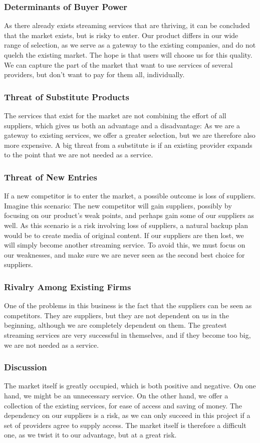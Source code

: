 \subsubsection*{Determinants of Buyer Power}
As there already exists streaming services that are thriving, it can be concluded that the market exists, but is risky to enter. Our product differs in our wide range of selection, as we serve as a gateway to the existing companies, and do not quelch the existing market. The hope is that users will choose us for this quality. We can capture the part of the market that want to use services of several providers, but don't want to pay for them all, individually.

\subsubsection*{Threat of Substitute Products}
The services that exist for the market are not combining the effort of all suppliers, which gives us both an advantage and a disadvantage: As we are a gateway to existing services, we offer a greater selection, but we are therefore also more expensive. A big threat from a substitute is if an existing provider expands to the point that we are not needed as a service.

\subsubsection*{Threat of New Entries}
If a new competitor is to enter the market, a possible outcome is loss of suppliers. Imagine this scenario: The new competitor will gain suppliers, possibly by focusing on our product's weak points, and perhaps gain some of our suppliers as well. As this scenario is a risk involving loss of suppliers, a natural backup plan would be to create media of original content. If our suppliers are then lost, we will simply become another streaming service. To avoid this, we must focus on our weaknesses, and make sure we are never seen as the second best choice for suppliers.

\subsubsection*{Rivalry Among Existing Firms}
One of the problems in this business is the fact that the suppliers can be seen as competitors. They are suppliers, but they are not dependent on us in the beginning, although we are completely dependent on them. The greatest streaming services are very successful in themselves, and if they become too big, we are not needed as a service.

\subsubsection*{Discussion}
The market itself is greatly occupied, which is both positive and negative. On one hand, we might be an unnecessary service. On the other hand, we offer a collection of the existing services, for ease of access and saving of money. The dependency on our suppliers is a risk, as we can only succeed in this project if a set of providers agree to supply access. The market itself is therefore a difficult one, as we twist it to our advantage, but at a great risk.